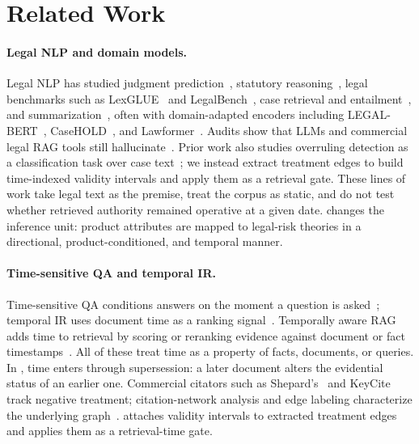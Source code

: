 \section{Related Work}
\label{sec:related}

\paragraph{Legal NLP and domain models.}
Legal NLP has studied judgment prediction~\citep{chalkidis2019neural}, statutory reasoning~\citep{holzenberger2020sara}, legal benchmarks such as LexGLUE~\citep{chalkidis2022lexglue} and LegalBench~\citep{guha2023legalbench}, case retrieval and entailment~\citep{rabelo2022coliee}, and summarization~\citep{huang2021efficient,manor2019plain}, often with domain-adapted encoders including LEGAL-BERT~\citep{chalkidis2020legalbert}, CaseHOLD~\citep{zheng2021legalbert}, and Lawformer~\citep{xiao2021lawformer}.
Audits show that LLMs and commercial legal RAG tools still hallucinate~\citep{dahl2024hallucinating,magesh2024hallucination}.
Prior work also studies overruling detection as a classification task over case text~\citep{zheng2021legalbert}; we instead extract treatment edges to build time-indexed validity intervals and apply them as a retrieval gate.
These lines of work take legal text as the premise, treat the corpus as static, and do not test whether retrieved authority remained operative at a given date.
\plre{} changes the inference unit: product attributes are mapped to legal-risk theories in a directional, product-conditioned, and temporal manner.

\paragraph{Time-sensitive QA and temporal IR.}
Time-sensitive QA conditions answers on the moment a question is asked~\citep{chen2021timeqa,zhang2021situatedqa,liska2022streamingqa,kasai2023realtimeqa}; temporal IR uses document time as a ranking signal~\citep{campos2014temporal,dhingra2022timeaware}.
Temporally aware RAG adds time to retrieval by scoring or reranking evidence against document or fact timestamps~\citep{gade2025tempralm,qian2024timer4}.
All of these treat time as a property of facts, documents, or queries.
In \plre{}, time enters through supersession: a later document alters the evidential status of an earlier one.
Commercial citators such as Shepard's~\citep{shepards2024} and KeyCite~\citep{keycite2024} track negative treatment; citation-network analysis and edge labeling characterize the underlying graph~\citep{fowler2007network,sadeghian2018semantic}.
\sysname{} attaches validity intervals to extracted treatment edges and applies them as a retrieval-time gate.

